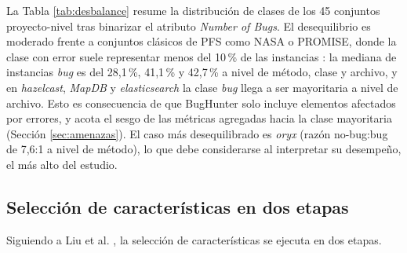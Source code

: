 \documentclass[conference,a4paper]{IEEEtran}
\begin{document}
La Tabla \ref{tab:desbalance} resume la distribución de clases de los 45 conjuntos proyecto-nivel tras binarizar el atributo \textit{Number of Bugs}. El desequilibrio es moderado frente a conjuntos clásicos de PFS como NASA o PROMISE, donde la clase con error suele representar menos del 10\,\% de las instancias \cite{tantithamthavorn2020}: la mediana de instancias \textit{bug} es del 28,1\,\%, 41,1\,\% y 42,7\,\% a nivel de método, clase y archivo, y en \textit{hazelcast}, \textit{MapDB} y \textit{elasticsearch} la clase \textit{bug} llega a ser mayoritaria a nivel de archivo. Esto es consecuencia de que BugHunter solo incluye elementos afectados por errores, y acota el sesgo de las métricas agregadas hacia la clase mayoritaria (Sección \ref{sec:amenazas}). El caso más desequilibrado es \textit{oryx} (razón no-bug:bug de 7,6:1 a nivel de método), lo que debe considerarse al interpretar su desempeño, el más alto del estudio.

\begin{table}[H]
\caption{Proporción de instancias con error (\textit{bug}) por nivel de granularidad, sobre los 15 proyectos individuales}
\label{tab:desbalance}
\centering
{}
\end{table}

\subsection{Selección de características en dos etapas}
\label{sec:seleccion}

Siguiendo a Liu et al. \cite{liu2015}, la selección de características se ejecuta en dos etapas.
\end{document}
